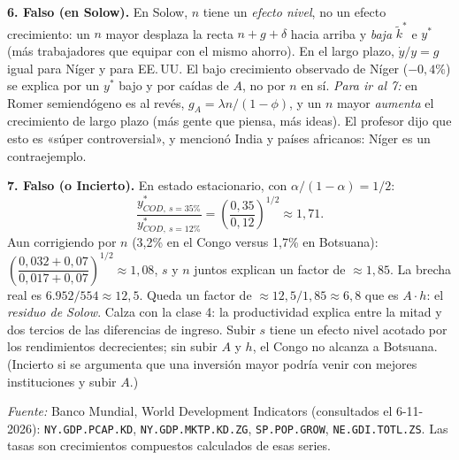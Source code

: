 \documentclass[11pt,letterpaper]{article}
\newcommand{\kt}{\tilde{k}}
\begin{document}
\textbf{6. Falso (en Solow).} En Solow, $n$ tiene un \emph{efecto nivel}, no un efecto crecimiento: un $n$ mayor desplaza
la recta $n+g+\delta$ hacia arriba y \emph{baja} $\kt^*$ e $y^*$ (más trabajadores que equipar con el mismo ahorro). En el largo plazo,
$\dot{y}/y = g$ igual para Níger y para EE.\,UU. El bajo crecimiento observado de Níger ($-0{,}4\%$) se explica por un
$y^*$ bajo y por caídas de $A$, no por $n$ en sí. \textit{Para ir al 7:} en Romer semiendógeno es al revés,
$g_A = \lambda n/(1-\phi)$, y un $n$ mayor \emph{aumenta} el crecimiento de largo plazo (más gente que piensa, más ideas).
El profesor dijo que esto es «súper controversial», y mencionó India y países africanos: Níger es un contraejemplo.

\textbf{7. Falso (o Incierto).} En estado estacionario, con $\alpha/(1-\alpha) = 1/2$:
\[
\frac{y^*_{COD,\ s=35\%}}{y^*_{COD,\ s=12\%}} = \left(\frac{0{,}35}{0{,}12}\right)^{1/2} \approx 1{,}71 .
\]
Aun corrigiendo por $n$ (3,2\% en el Congo versus 1,7\% en Botsuana):
$\left(\dfrac{0{,}032+0{,}07}{0{,}017+0{,}07}\right)^{1/2} \approx 1{,}08$, $s$ y $n$ juntos explican un factor de $\approx 1{,}85$.
La brecha real es $6.952/554 \approx 12{,}5$. Queda un factor de $\approx 12{,}5/1{,}85 \approx 6{,}8$ que es $A\cdot h$: el
\emph{residuo de Solow}. Calza con la clase 4: la productividad explica entre la mitad y dos tercios de las diferencias de
ingreso. Subir $s$ tiene un efecto nivel acotado por los rendimientos decrecientes; sin subir $A$ y $h$, el Congo no
alcanza a Botsuana. (Incierto si se argumenta que una inversión mayor podría venir con mejores instituciones y subir $A$.)

\vfill
{\raggedright\small\textit{Fuente:} Banco Mundial, World Development Indicators (consultados el 6-11-2026): \texttt{NY.GDP.PCAP.KD},
\texttt{NY.GDP.MKTP.KD.ZG}, \texttt{SP.POP.GROW}, \texttt{NE.GDI.TOTL.ZS}. Las tasas son crecimientos compuestos calculados de esas series.\par}
\end{document}
